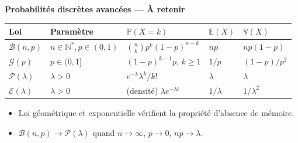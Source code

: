\documentclass[11pt,a4paper,twoside]{book}
\newcommand{\N}{\mathbb{N}}
\begin{document}
\begin{retenirbox}
\textbf{Probabilités discrètes avancées — À retenir}

\begin{tabular}{lllll}
\toprule
Loi & Paramètre & $\mathbb{P}(X=k)$ & $\mathbb{E}(X)$ & $\mathbb{V}(X)$ \\
\midrule
$\mathcal{B}(n,p)$ & $n \in \N^*, p\in(0,1)$ & $\binom{n}{k}p^k(1-p)^{n-k}$ & $np$ & $np(1-p)$ \\
$\mathcal{G}(p)$ & $p\in(0,1]$ & $(1-p)^{k-1}p$, $k\geq 1$ & $1/p$ & $(1-p)/p^2$ \\
$\mathcal{P}(\lambda)$ & $\lambda>0$ & $e^{-\lambda}\lambda^k/k!$ & $\lambda$ & $\lambda$ \\
$\mathcal{E}(\lambda)$ & $\lambda>0$ & (densité) $\lambda e^{-\lambda t}$ & $1/\lambda$ & $1/\lambda^2$ \\
\bottomrule
\end{tabular}
\vspace{0.5em}
\begin{itemize}
  \item Loi géométrique et exponentielle vérifient la propriété d'absence de mémoire.
  \item $\mathcal{B}(n,p) \to \mathcal{P}(\lambda)$ quand $n \to \infty$, $p \to 0$, $np \to \lambda$.
\end{itemize}
\end{retenirbox}
\end{document}
